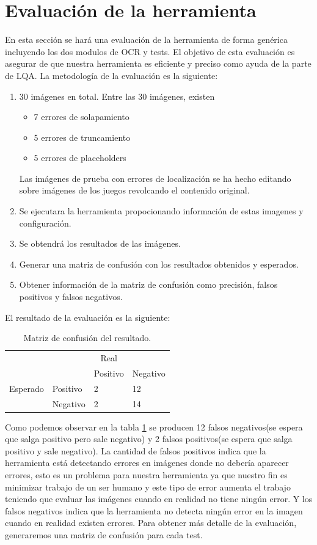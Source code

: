 \section{Evaluación de la herramienta}
\label{sec:Evaluación_herramienta}
En esta sección se hará una evaluación de la herramienta de forma genérica incluyendo los dos modulos de OCR y tests.
El objetivo de esta evaluación es asegurar de que nuestra herramienta es eficiente y preciso como ayuda de la parte de LQA.
La metodología de la evaluación es la siguiente:
\begin{enumerate}
	\item 30 imágenes en total. Entre las 30 imágenes, existen \begin{itemize}
		\item 7 errores de solapamiento
		\item 5 errores de truncamiento
		\item 5 errores de placeholders
	\end{itemize}
	Las imágenes de prueba con errores de localización se ha hecho editando sobre imágenes de los juegos revolcando el contenido original.
	\item Se ejecutara la herramienta propocionando información de estas imagenes y configuración.
	\item Se obtendrá los resultados de las imágenes.
	\item Generar una matriz de confusión con los resultados obtenidos y esperados.
	\item Obtener información de la matriz de confusión como precisión, falsos positivos y falsos negativos.
\end{enumerate}
El resultado de la evaluación es la siguiente:
\begin{table}[H]
	\centering
	\begin{tabular}{llll}
		&          & \multicolumn{1}{c}{Real} &                            \\
		&          & Positivo                 & Negativo                   \\
		Esperado & Positivo & 2            & 12 \\
		& Negativo & 2        & 14                        
	\end{tabular}
	\caption{Matriz de confusión del resultado.}
	\label{table:mt_ori}
\end{table}

Como podemos observar en la tabla \ref{table:mt_ori} se producen 12 falsos negativos(se espera que salga positivo pero sale negativo) y 2 falsos positivos(se espera que salga positivo y sale negativo). La cantidad de falsos positivos indica que la herramienta está detectando errores en imágenes donde no debería aparecer errores, esto es un problema para nuestra herramienta ya que nuestro fin es minimizar trabajo de un ser humano y este tipo de error aumenta el trabajo teniendo que evaluar las imágenes cuando en realidad no tiene ningún error. Y los falsos negativos indica que la herramienta no detecta ningún error en la imagen cuando en realidad existen errores. Para obtener más detalle de la evaluación, generaremos una matriz de confusión para cada test.

